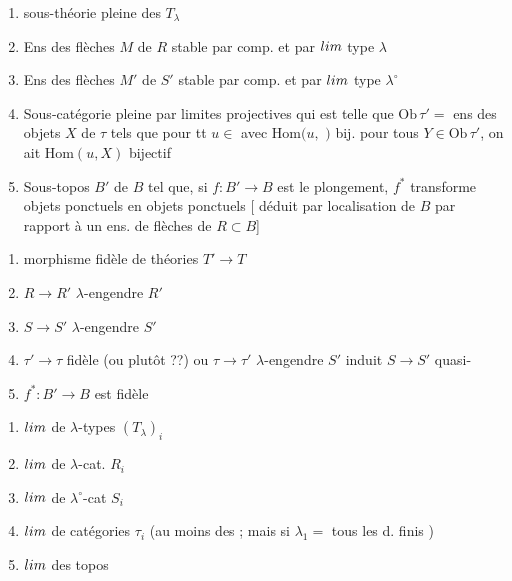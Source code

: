 \documentclass[11pt,a4paper]{article}
\begin{document}
\begin{enumerate}
  \item[{[T]}] sous-théorie pleine des $T_{\lambda}$
  \item[{[R]}] Ens des flèches $M$ de $R$ stable par comp. et par
    $\varinjlim$ type $\lambda$
  \item[{[S]}] Ens des flèches $M'$ de $S'$ stable par comp. et par
    $\varprojlim$ type $\lambda^{\circ}$
  \item[{[$\tau$]}] Sous-catégorie pleine 
     par limites
    projectives \ill{} qui est telle que $\mathrm{Ob}\,\tau' = $ ens des
    objets $X$ de $\tau$ tels que pour tt $u \in$
     avec $\mathrm{Hom}(u,$ $)$
    bij. pour tous $Y \in \mathrm{Ob}\,\tau'$, on ait $\mathrm{Hom}(u, X)$
    bijectif
  \item[{[B]}] Sous-topos $B'$ de $B$ tel que, si $f : B' \to B$ est le
    plongement, $f^{*}$ transforme objets ponctuels en objets ponctuels
    [\struck{\ill{}} déduit par localisation de $B$ par rapport à un ens.
    de flèches de $R \subset B$] 
\end{enumerate}

\begin{enumerate}
  \item[{[T]}] \struck{\ill{}} morphisme fidèle de théories $T' \to T$
  \item[{[R]}] $R \to R'$ $\lambda$-engendre $R'$
  \item[{[S]}] $S \to S'$ $\lambda$-engendre $S'$
  \item[{[$\tau$]}] $\tau' \to \tau$ fidèle (ou plutôt ??) ou $\tau \to
    \tau'$ $\lambda$-engendre $S'$ \ill{} induit $S \to S'$ quasi-\ill{}
  \item[{[B]}] $f^{*} : B' \to B$ est fidèle 
\end{enumerate}

\begin{enumerate}
  \item[{[T]}] $\varprojlim$ de $\lambda$-types $(T_{\lambda})_{i}$
  \item[{[R]}] $\varinjlim$ de $\lambda$-cat. $R_{i}$
  \item[{[S]}] $\varinjlim$ de $\lambda^{\circ}$-cat $S_{i}$
  \item[{[$\tau$]}] $\varprojlim$ de \struck{\ill{}} catégories $\tau_{i}$
    (au moins \ill{} des \ill{} ; mais \ill{} si $\lambda_{1} = $ tous
    les d. finis \ill{})
  \item[{[B]}] $\varprojlim$ des topos
\end{enumerate}
\end{document}
